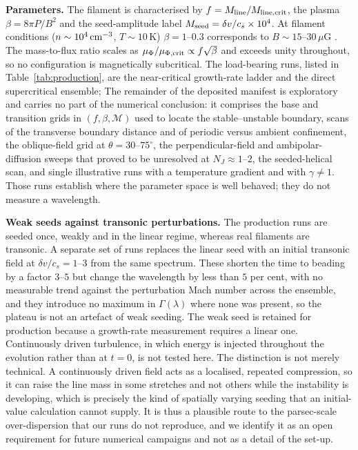\documentclass[usenatbib,twoside,twocolumn]{mnras}
\begin{document}
\smallskip\noindent\textbf{Parameters.} The filament is characterised by $f=M_{\rm line}/M_{\rm line,crit}$, the plasma $\beta=8\pi P/B^2$ and the seed-amplitude label $M_{\rm seed}=\delta v/c_s\times10^{4}$. At filament conditions ($n\sim10^4\,{\rm cm^{-3}}$, $T\sim10$\,K) $\beta=1$--$0.3$ corresponds to $B\sim15$--$30\,\mu$G \citep{Crutcher2012}. The mass-to-flux ratio scales as $\mu_\Phi/\mu_{\Phi,\rm crit}\propto f\sqrt{\beta}$ and exceeds unity throughout, so no configuration is magnetically subcritical. The load-bearing runs, listed in Table~\ref{tab:production}, are the near-critical growth-rate ladder and the direct supercritical ensemble; The remainder of the deposited manifest is exploratory and carries no part of the numerical conclusion: it comprises the base and transition grids in $(f,\beta,\mathcal{M})$ used to locate the stable--unstable boundary, scans of the transverse boundary distance and of periodic versus ambient confinement, the oblique-field grid at $\theta=30$--$75^\circ$, the perpendicular-field and ambipolar-diffusion sweeps that proved to be unresolved at $N_J\approx1$--$2$, the seeded-helical scan, and single illustrative runs with a temperature gradient and with $\gamma\neq1$. Those runs establish where the parameter space is well behaved; they do not measure a wavelength.

\smallskip\noindent\textbf{Weak seeds against transonic perturbations.} The production runs are seeded once, weakly and in the linear regime, whereas real filaments are transonic. A separate set of runs replaces the linear seed with an initial transonic field at $\delta v/c_s=1$--$3$ from the same spectrum. These shorten the time to beading by a factor $3$--$5$ but change the wavelength by less than $5$ per cent, with no measurable trend against the perturbation Mach number across the ensemble, and they introduce no maximum in $\Gamma(\lambda)$ where none was present, so the plateau is not an artefact of weak seeding. The weak seed is retained for production because a growth-rate measurement requires a linear one. Continuously driven turbulence, in which energy is injected throughout the evolution rather than at $t=0$, is not tested here. The distinction is not merely technical. A continuously driven field acts as a localised, repeated compression, so it can raise the line mass in some stretches and not others while the instability is developing, which is precisely the kind of spatially varying seeding that an initial-value calculation cannot supply. It is thus a plausible route to the parsec-scale over-dispersion that our runs do not reproduce, and we identify it as an open requirement for future numerical campaigns and not as a detail of the set-up.
\end{document}

